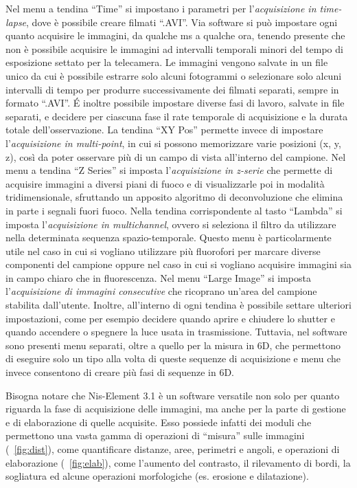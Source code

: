 Nel menu a tendina ``Time'' si impostano i parametri per l'\textit{acquisizione in time-lapse}, dove è possibile creare filmati ``.AVI''. 
Via software si può impostare ogni quanto acquisire le immagini, da qualche ms a qualche ora, tenendo presente che non è possibile acquisire le immagini ad intervalli temporali minori del tempo di esposizione settato per la telecamera. 
Le immagini vengono salvate in un file unico da cui è possibile estrarre solo alcuni fotogrammi o selezionare solo alcuni intervalli di tempo per produrre successivamente dei filmati separati, sempre in formato ``.AVI''. 
\'E inoltre possibile impostare diverse fasi di lavoro, salvate in file separati, e decidere per ciascuna fase il rate temporale di acquisizione e la durata totale dell'osservazione. 
La tendina ``XY Pos'' permette invece di impostare l'\textit{acquisizione in multi-point}, in cui si possono memorizzare varie posizioni (x, y, z), così da poter osservare più di un campo di vista all'interno del campione. 
Nel menu a tendina ``Z Series'' si imposta l'\textit{acquisizione in z-serie} che permette di acquisire immagini a diversi piani di fuoco e di visualizzarle poi in modalità tridimensionale, sfruttando un apposito algoritmo di deconvoluzione che elimina in parte i segnali fuori fuoco.
Nella tendina corrispondente al tasto ``Lambda'' si imposta l'\textit{acquisizione in multichannel}, ovvero si seleziona il filtro da utilizzare nella determinata sequenza spazio-temporale. 
Questo menu è particolarmente utile nel caso in cui si vogliano utilizzare più fluorofori per marcare diverse componenti del campione oppure nel caso in cui si vogliano acquisire immagini sia in campo chiaro che in fluorescenza. 
Nel menu ``Large Image'' si imposta l'\textit{acquisizione di immagini consecutive} che ricoprano un'area del campione stabilita dall'utente.
Inoltre, all'interno di ogni tendina è possibile settare ulteriori impostazioni, come per esempio decidere quando aprire e chiudere lo shutter e quando accendere o spegnere la luce usata in trasmissione.
Tuttavia, nel software sono presenti menu separati, oltre a quello per la misura in 6D, che permettono di eseguire solo un tipo alla volta di queste sequenze di acquisizione e menu che invece consentono di creare più fasi di sequenze in 6D.

Bisogna notare che Nis-Element 3.1 è un software versatile non solo per quanto riguarda la fase di acquisizione delle immagini, ma anche per la parte di gestione e di elaborazione di quelle acquisite. 
Esso possiede infatti dei moduli che permettono una vasta gamma di operazioni di ``misura'' sulle immagini (\figurename~\ref{fig:dist}), come quantificare distanze, aree, perimetri e angoli, e operazioni di elaborazione (\figurename~\ref{fig:elab}), come l'aumento del contrasto, il rilevamento di bordi, la sogliatura ed alcune operazioni morfologiche (es. erosione e dilatazione).

